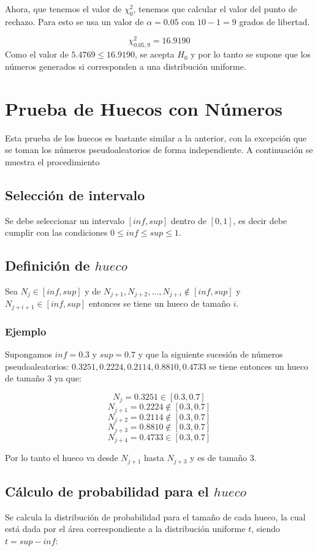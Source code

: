 Ahora, que tenemos el valor de $\chi^2_0$, tenemos que calcular el valor del punto de rechazo. Para esto se usa un valor de $\alpha =  0.05$ con $10-1=9$ grados de libertad.

$$\chi^2_{0.05,9} = 16.9190$$
Como el valor de $5.4769 \leq 16.9190$, se acepta $H_0$ y por lo tanto se supone que los números generados si corresponden a una distribución uniforme.


\section{Prueba de Huecos con Números}
Esta prueba de los huecos es bastante similar a la anterior, con la excepción que se toman los números pseudoaleatorios de forma independiente. A continuación se muestra el procedimiento

\subsection{Selección de intervalo}
Se debe seleccionar un intervalo $[inf,sup]$ dentro de $[0,1]$, es decir debe cumplir con las condiciones $0 \leq inf \leq sup \leq 1$.

\subsection{Definición de $hueco$}
Sea $N_j \in  [inf,sup]$  y de $N_{j+1},N_{j+2}, \dots, N_{j+i} \not \in [inf,sup]$ y $N_{j+i+1} \in [inf,sup]$ entonces se tiene un hueco de tamaño $i$.

\subsubsection{Ejemplo}
Supongamos $inf=0.3$ y $sup=0.7$ y que la siguiente sucesión de números pseudoaleatorios: $0.3251, 0.2224, 0.2114, 0.8810, 0.4733$ se tiene entonces un hueco de tamaño 3 ya que:

$$N_{j}   = 0.3251  \in [0.3,0.7]$$
$$N_{j+1} = 0.2224  \not \in [0.3,0.7]$$
$$N_{j+2} = 0.2114  \not \in [0.3,0.7]$$
$$N_{j+3} = 0.8810  \not \in [0.3,0.7]$$
$$N_{j+4} = 0.4733  \in [0.3,0.7]$$

Por lo tanto el hueco va desde $N_{j+1}$ hasta $N_{j+3}$ y es de tamaño $3$.

\subsection{Cálculo de probabilidad para el $hueco$}
Se calcula la distribución de probabilidad para el tamaño de cada hueco, la cual está dada por el área correspondiente a la distribución uniforme $t$, siendo $t = sup-inf$:

